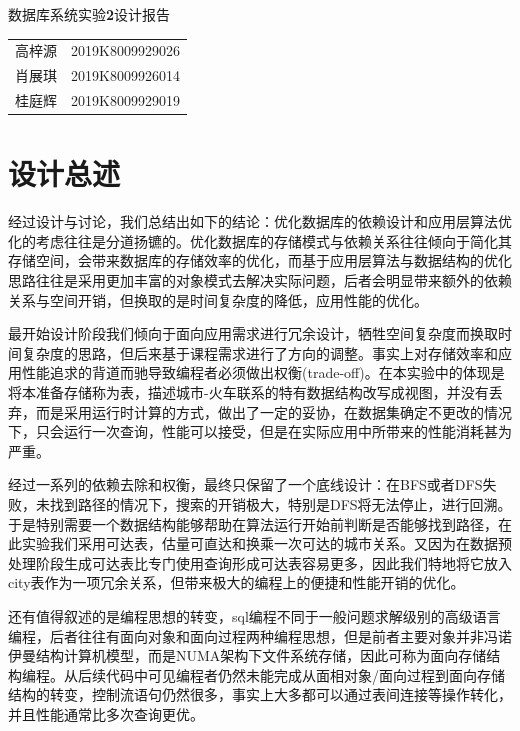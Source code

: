 \documentclass[UTF-8,twoside,c5size,hyperref]{ctexart}
\begin{document}
	\begin{center}
		\heiti{}
		数据库系统实验\textbf{2}设计报告
	\end{center}

	\begin{table}[!h]
        \raggedleft
        \begin{tabular}{rc}
            高梓源 & 2019K8009929026\\
            肖展琪 & 2019K8009926014\\
            桂庭辉 & 2019K8009929019
        \end{tabular}
    \end{table}
    
    \section{设计总述}
    
    经过设计与讨论，我们总结出如下的结论：优化数据库的依赖设计和应用层算法优化的考虑往往是分道扬镳的。优化数据库的存储模式与依赖关系往往倾向于简化其存储空间，会带来数据库的存储效率的优化，而基于应用层算法与数据结构的优化思路往往是采用更加丰富的对象模式去解决实际问题，后者会明显带来额外的依赖关系与空间开销，但换取的是时间复杂度的降低，应用性能的优化。
    
    最开始设计阶段我们倾向于面向应用需求进行冗余设计，牺牲空间复杂度而换取时间复杂度的思路，但后来基于课程需求进行了方向的调整。事实上对存储效率和应用性能追求的背道而驰导致编程者必须做出权衡(trade-off)。在本实验中的体现是将本准备存储称为表，描述城市-火车联系的特有数据结构改写成视图，并没有丢弃，而是采用运行时计算的方式，做出了一定的妥协，在数据集确定不更改的情况下，只会运行一次查询，性能可以接受，但是在实际应用中所带来的性能消耗甚为严重。
    
    经过一系列的依赖去除和权衡，最终只保留了一个底线设计：在BFS或者DFS失败，未找到路径的情况下，搜索的开销极大，特别是DFS将无法停止，进行回溯。于是特别需要一个数据结构能够帮助在算法运行开始前判断是否能够找到路径，在此实验我们采用可达表，估量可直达和换乘一次可达的城市关系。又因为在数据预处理阶段生成可达表比专门使用查询形成可达表容易更多，因此我们特地将它放入city表作为一项冗余关系，但带来极大的编程上的便捷和性能开销的优化。
    
    还有值得叙述的是编程思想的转变，sql编程不同于一般问题求解级别的高级语言编程，后者往往有面向对象和面向过程两种编程思想，但是前者主要对象并非冯诺伊曼结构计算机模型，而是NUMA架构下文件系统存储，因此可称为面向存储结构编程。从后续代码中可见编程者仍然未能完成从面相对象/面向过程到面向存储结构的转变，控制流语句仍然很多，事实上大多都可以通过表间连接等操作转化，并且性能通常比多次查询更优。
    
\end{document}
